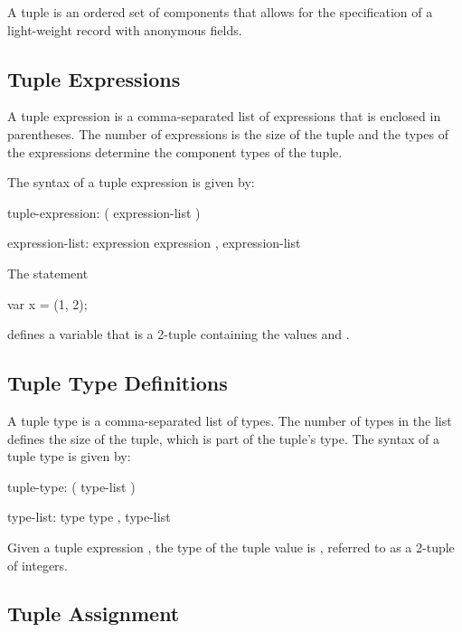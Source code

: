 \label{Tuples}

A tuple is an ordered set of components that allows for the
specification of a light-weight record with anonymous fields.

\subsection{Tuple Expressions}
\label{Tuple_Expressions}

A tuple expression is a comma-separated list of expressions that is
enclosed in parentheses.  The number of expressions is the size of the
tuple and the types of the expressions determine the component types
of the tuple.

The syntax of a tuple expression is given by:
\begin{syntax}
tuple-expression:
  ( expression-list )

expression-list:
  expression
  expression , expression-list
\end{syntax}

\begin{example}
The statement
\begin{chapel}
var x = (1, 2);
\end{chapel}
defines a variable  that is a 2-tuple containing the values
 and .
\end{example}

\subsection{Tuple Type Definitions}
\label{Tuple_Type_Definitions}

A tuple type is a comma-separated list of types.  The number of types
in the list defines the size of the tuple, which is part of the
tuple's type.  The syntax of a tuple type is given by:
\begin{syntax}
tuple-type:
  ( type-list )

type-list:
  type
  type , type-list
\end{syntax}

\begin{example}
Given a tuple expression , the type of the tuple value is
, referred to as a 2-tuple of integers.
\end{example}

\subsection{Tuple Assignment}
\label{Tuple_Assignment}

